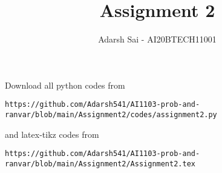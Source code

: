 \documentclass[journal,12pt,twocolumn]{IEEEtran}
\DeclareMathOperator*{\Res}{Res}
\begin{document}
\newcommand{\BEQA}{\begin{eqnarray}}
\newcommand{\EEQA}{\end{eqnarray}}
\newcommand{\define}{\stackrel{\triangle}{=}}

\raggedbottom
\setlength{\parindent}{0pt}
\providecommand{\mbf}{\mathbf}
\providecommand{\pr}[1]{\ensuremath{\Pr\left(#1\right)}}
\providecommand{\qfunc}[1]{\ensuremath{Q\left(#1\right)}}
\providecommand{\sbrak}[1]{\ensuremath{{}\left[#1\right]}}
\providecommand{\lsbrak}[1]{\ensuremath{{}\left[#1\right.}}
\providecommand{\rsbrak}[1]{\ensuremath{{}\left.#1\right]}}
\providecommand{\brak}[1]{\ensuremath{\left(#1\right)}}
\providecommand{\lbrak}[1]{\ensuremath{\left(#1\right.}}
\providecommand{\rbrak}[1]{\ensuremath{\left.#1\right)}}
\providecommand{\cbrak}[1]{\ensuremath{\left\{#1\right\}}}
\providecommand{\lcbrak}[1]{\ensuremath{\left\{#1\right.}}
\providecommand{\rcbrak}[1]{\ensuremath{\left.#1\right\}}}
\theoremstyle{remark}
\newtheorem{rem}{Remark}
\newcommand{\sgn}{\mathop{\mathrm{sgn}}}
\providecommand{\abs}[1]{\vert#1\vert}
\providecommand{\res}[1]{\Res\displaylimits_{#1}} 
\providecommand{\norm}[1]{\lVert#1\rVert}
\providecommand{\mtx}[1]{\mathbf{#1}}
\providecommand{\mean}[1]{E[ #1 ]}
\providecommand{\fourier}{\overset{\mathcal{F}}{ \rightleftharpoons}}
\providecommand{\system}{\overset{\mathcal{H}}{ \longleftrightarrow}}
\newcommand{\solution}{\noindent \textbf{Solution: }}
\newcommand{\cosec}{\,\text{cosec}\,}
\providecommand{\dec}[2]{\ensuremath{\overset{#1}{\underset{#2}{\gtrless}}}}
\newcommand{\myvec}[1]{\ensuremath{\begin{pmatrix}#1\end{pmatrix}}}
\newcommand{\mydet}[1]{\ensuremath{\begin{vmatrix}#1\end{vmatrix}}}
\makeatletter
{}
\makeatother
\let\StandardTheFigure\thefigure
\let\vec\mathbf
\renewcommand{\thefigure}{\theproblem}
\def\putbox#1#2#3{\makebox[0in][l]{\makebox[#1][l]{}\raisebox{\baselineskip}[0in][0in]{\raisebox{#2}[0in][0in]{#3}}}}
     \def\rightbox#1{\makebox[0in][r]{#1}}
     \def\centbox#1{\makebox[0in]{#1}}
     \def\topbox#1{\raisebox{-\baselineskip}[0in][0in]{#1}}
     \def\midbox#1{\raisebox{-0.5\baselineskip}[0in][0in]{#1}}
\vspace{3cm}
\title{Assignment 2}
\author{Adarsh Sai - AI20BTECH11001}
\maketitle
\newpage
\bigskip
\renewcommand{\thefigure}{\theenumi}
\renewcommand{\thetable}{\theenumi}
Download all python codes from 
\begin{lstlisting}
https://github.com/Adarsh541/AI1103-prob-and-ranvar/blob/main/Assignment2/codes/assignment2.py
\end{lstlisting}
%
and latex-tikz codes from 
%
\begin{lstlisting}
https://github.com/Adarsh541/AI1103-prob-and-ranvar/blob/main/Assignment2/Assignment2.tex
\end{lstlisting}
\end{document}
